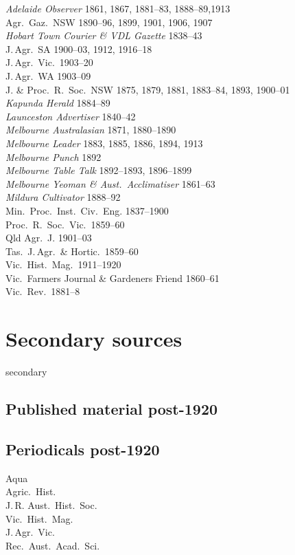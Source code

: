 \textsl{Adelaide Observer} 1861, 1867, 1881--83, 1888--89,1913\\
Agr.\ Gaz.\ NSW  1890--96, 1899, 1901, 1906, 1907\\
\textsl{Hobart Town Courier \& VDL Gazette} 1838--43\\ 
J.\,Agr.\ SA 1900--03, 1912, 1916--18\\
J.\,Agr.\ Vic.\ 1903--20\\
J.\,Agr.\ WA 1903--09\\
J. \& Proc.\ R.~Soc.\ NSW 1875, 1879, 1881, 1883--84, 1893, 1900--01\\
\textsl{Kapunda Herald} 1884--89\\
\textsl{Launceston Advertiser} 1840--42\\
\textsl{Melbourne Australasian} 1871, 1880--1890\\
\textsl{Melbourne Leader} 1883, 1885, 1886, 1894, 1913\\
\textsl{Melbourne Punch} 1892\\
\textsl{Melbourne Table Talk} 1892--1893, 1896--1899\\
\textsl{Melbourne Yeoman \& Aust.\ Acclimatiser} 1861--63\\
\textsl{Mildura Cultivator} 1888--92\\
Min.\ Proc.\ Inst.\ Civ.\ Eng. 1837--1900\\
Proc.\ R.~Soc.\ Vic.\ 1859--60\\
Qld Agr.\ J. 1901--03\\
Tas.\ J.\,Agr.\ \& Hortic.\  1859--60\\
Vic.\ Hist.\ Mag.\ 1911--1920\\
Vic.\ Farmers Journal \& Gardeners Friend 1860--61\\
Vic.\ Rev.\ 1881--8\\

\section*{Secondary sources}

\begin{btSect}{secondary}
\subsection*{Published material post-1920}
\btPrintAll
\end{btSect}

\subsection*{Periodicals post-1920}

Aqua\\
Agric.\ Hist.\\
J.\,R. Aust.\ Hist.\ Soc.\\
Vic.\ Hist.\ Mag.\\
J.\,Agr.\ Vic.\\
Rec.\ Aust.\ Acad.\ Sci.\\



